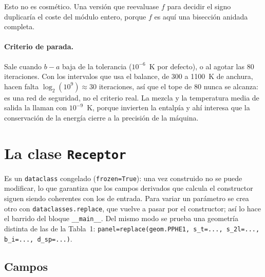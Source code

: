 \documentclass[11pt,a4paper]{article}
\begin{document}
Esto no es cosmético. Una versión que reevaluase $f$ para decidir el signo
duplicaría el coste del módulo entero, porque $f$ es aquí una bisección anidada
completa.

\paragraph{Criterio de parada.} Sale cuando $b - a$ baja de la tolerancia
($10^{-6}$~K por defecto), o al agotar las 80 iteraciones. Con los intervalos que
usa el balance, de 300 a 1100~K de anchura, hacen falta
$\log_2(10^9) \approx 30$ iteraciones, así que el tope de 80 nunca se alcanza: es
una red de seguridad, no el criterio real. La mezcla y la temperatura media de
salida la llaman con $10^{-9}$~K, porque invierten la entalpía y ahí interesa
que la conservación de la energía cierre a la precisión de la máquina.

\section{La clase \texttt{Receptor}}

Es un \texttt{dataclass} congelado (\texttt{frozen=True}): una vez construido no
se puede modificar, lo que garantiza que los campos derivados que calcula el
constructor siguen siendo coherentes con los de entrada. Para variar un
parámetro se crea otro con \texttt{dataclasses.replace}, que vuelve a pasar por
el constructor; así lo hace el barrido del bloque \texttt{\_\_main\_\_}. Del mismo
modo se prueba una geometría distinta de las de la Tabla~1:
\texttt{panel=replace(geom.PPHE1, s\_t=..., s\_2l=..., b\_i=..., d\_sp=...)}.

\subsection{Campos}
\end{document}
